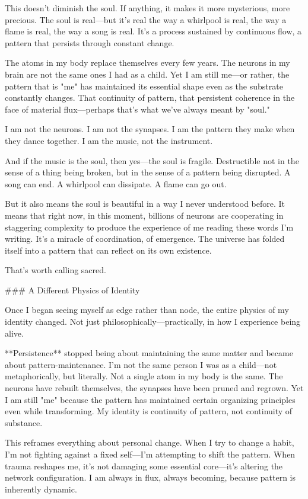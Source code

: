 This doesn't diminish the soul. If anything, it makes it more mysterious, more precious. The soul is real—but it's real the way a whirlpool is real, the way a flame is real, the way a song is real. It's a process sustained by continuous flow, a pattern that persists through constant change.

The atoms in my body replace themselves every few years. The neurons in my brain are not the same ones I had as a child. Yet I am still me—or rather, the pattern that is "me" has maintained its essential shape even as the substrate constantly changes. That continuity of pattern, that persistent coherence in the face of material flux—perhaps that's what we've always meant by "soul."

I am not the neurons. I am not the synapses. I am the pattern they make when they dance together. I am the music, not the instrument.

And if the music is the soul, then yes—the soul is fragile. Destructible not in the sense of a thing being broken, but in the sense of a pattern being disrupted. A song can end. A whirlpool can dissipate. A flame can go out.

But it also means the soul is beautiful in a way I never understood before. It means that right now, in this moment, billions of neurons are cooperating in staggering complexity to produce the experience of me reading these words I'm writing. It's a miracle of coordination, of emergence. The universe has folded itself into a pattern that can reflect on its own existence.

That's worth calling sacred.

### A Different Physics of Identity

Once I began seeing myself as edge rather than node, the entire physics of my identity changed. Not just philosophically—practically, in how I experience being alive.

**Persistence** stopped being about maintaining the same matter and became about pattern-maintenance. I'm not the same person I was as a child—not metaphorically, but literally. Not a single atom in my body is the same. The neurons have rebuilt themselves, the synapses have been pruned and regrown. Yet I am still "me" because the pattern has maintained certain organizing principles even while transforming. My identity is continuity of pattern, not continuity of substance.

This reframes everything about personal change. When I try to change a habit, I'm not fighting against a fixed self—I'm attempting to shift the pattern. When trauma reshapes me, it's not damaging some essential core—it's altering the network configuration. I am always in flux, always becoming, because pattern is inherently dynamic.

